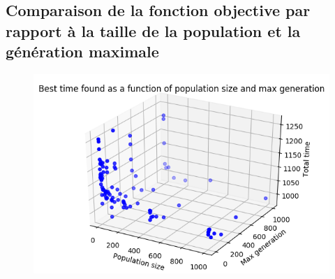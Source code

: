 \newpage

\subsection{Comparaison de la fonction objective par rapport à la taille de la population et la génération maximale}

\begin{figure}[!h]
    \centering
    \includegraphics[]{report/Pictures/setb4c9_benchmarks_generation_with_solution_time.png}
\end{figure}

